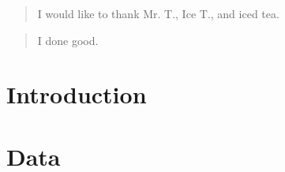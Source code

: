 \documentclass[12pt, letterpaper, twoside, openright]{report}
\begin{document}
\renewcommand{\abstractname}{Acknowledgements}
\begin{abstract}
    \thispagestyle{plain}
    \setcounter{page}{4}
    I would like to thank Mr. T., Ice T., and iced tea.
\end{abstract}


\tableofcontents
\listoffigures
\listoftables
\printnomenclature


\renewcommand{\abstractname}{Declaration of Academic Achievement}
\begin{abstract}
    \thispagestyle{plain}
    \setcounter{page}{12}
    I done good.
\end{abstract}


\pagestyle{fancy}
\fancyhead{}
\fancyfoot{}
\fancyfoot[CE,CO]{\thepage}


\chapter{Introduction}


\chapter{Data}









\end{document}

